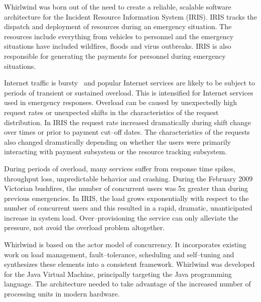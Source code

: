 \documentclass[conference]{IEEEtran}
\begin{document}
Whirlwind was born out of the need to create a reliable, scalable software architecture for the Incident Resource Information System (IRIS). IRIS tracks the dispatch and deployment of resources during an emergency situation. The resources include everything from vehicles to personnel and the emergency situations have included wildfires, floods and virus outbreaks. IRIS is also responsible for generating the payments for personnel during emergency situations.


Internet traffic is bursty~\cite{Crovella:1996:BurstyTraffic} and popular Internet services are likely to be subject to periods of transient or sustained overload. This is intensified for Internet services used in emergency responses. Overload can be caused by unexpectedly high request rates or unexpected shifts in the characteristics of the request distribution. In IRIS the request rate increased dramatically during shift change over times or prior to payment cut--off dates. The characteristics of the requests also changed dramatically depending on whether the users were primarily interacting with payment subsystem or the resource tracking subsystem.

During periods of overload, many services suffer from response time spikes, throughput loss, unpredictable behavior and crashing. During the February 2009 Victorian bushfires, the number of concurrent users was 5x greater than during previous emergencies. In IRIS, the load grows exponentially with respect to the number of concurrent users and this resulted in a rapid, dramatic, unanticipated increase in system load. Over--provisioning the service can only alleviate the pressure, not avoid the overload problem altogether. 
 
Whirlwind is based on the actor model of concurrency. It incorporates existing work on load management, fault--tolerance, scheduling and self--tuning and synthesizes these elements into a consistent framework. Whirlwind was developed for the Java Virtual Machine, principally targeting the Java programming language. The architecture needed to take advantage of the increased number of processing units in modern hardware.
\end{document}
